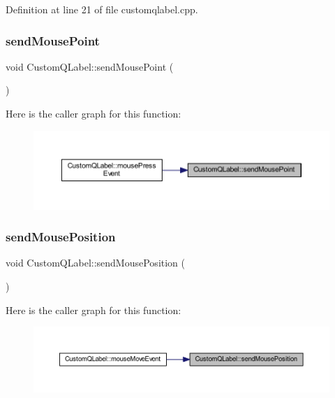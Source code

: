 Definition at line 21 of file customqlabel.\+cpp.

\mbox{\label{classCustomQLabel_a7d4eb54a2a007c20a19dd5f7fac50af4}} 
\subsubsection{\texorpdfstring{sendMousePoint}{sendMousePoint}}
{\footnotesize\ttfamily void Custom\+Q\+Label\+::send\+Mouse\+Point (\begin{DoxyParamCaption}\item[{Q\+Point \&}]{ }\end{DoxyParamCaption})\hspace{0.3cm}{\ttfamily [signal]}}

Here is the caller graph for this function\+:
\nopagebreak
\begin{figure}[H]
\begin{center}
\leavevmode
\includegraphics[width=350pt]{classCustomQLabel_a7d4eb54a2a007c20a19dd5f7fac50af4_icgraph}
\end{center}
\end{figure}
\mbox{\label{classCustomQLabel_ac07a9c61c0ac4df046b70cbec46e1af5}} 
\subsubsection{\texorpdfstring{sendMousePosition}{sendMousePosition}}
{\footnotesize\ttfamily void Custom\+Q\+Label\+::send\+Mouse\+Position (\begin{DoxyParamCaption}\item[{Q\+Point \&}]{ }\end{DoxyParamCaption})\hspace{0.3cm}{\ttfamily [signal]}}

Here is the caller graph for this function\+:
\nopagebreak
\begin{figure}[H]
\begin{center}
\leavevmode
\includegraphics[width=350pt]{classCustomQLabel_ac07a9c61c0ac4df046b70cbec46e1af5_icgraph}
\end{center}
\end{figure}



